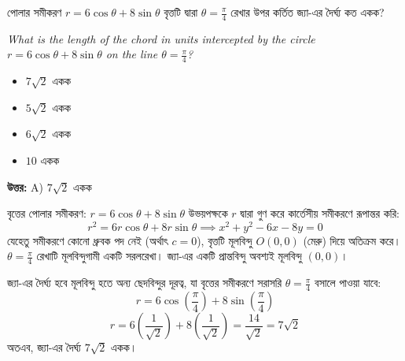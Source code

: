 \documentclass[12pt, a4paper]{article}
\begin{document}
\begin{tcolorbox}[questionbox={প্রশ্ন (Question) 4}]
    \noindent
    পোলার সমীকরণ $r = 6\cos\theta + 8\sin\theta$ বৃত্তটি দ্বারা $\theta = \frac{\pi}{4}$ রেখার উপর কর্তিত জ্যা-এর দৈর্ঘ্য কত একক?
    
    \vspace{0.8em}
    \begin{english}
    \noindent\textit{\color{darkgray}
    What is the length of the chord in units intercepted by the circle $r = 6\cos\theta + 8\sin\theta$ on the line $\theta = \frac{\pi}{4}$?
    }
    \end{english}
\end{tcolorbox}

\begin{itemize}[label={}, leftmargin=1cm, itemsep=0.5em]
    \item[\textbf{A)}] $7\sqrt{2}$ একক
    \item[\textbf{B)}] $5\sqrt{2}$ একক
    \item[\textbf{C)}] $6\sqrt{2}$ একক
    \item[\textbf{D)}] $10$ একক
\end{itemize}

\vspace{0.5em}
\begin{tcolorbox}[answerbox]
    \textbf{\color{success} উত্তর:} A) $7\sqrt{2}$ একক
\end{tcolorbox}
\vspace{1em}

\begin{tcolorbox}[solutionbox={সমাধান (Solution)}]
    \noindent
    বৃত্তের পোলার সমীকরণ: $r = 6\cos\theta + 8\sin\theta$
    উভয়পক্ষকে $r$ দ্বারা গুণ করে কার্তেসীয় সমীকরণে রূপান্তর করি:
    \[ r^2 = 6r\cos\theta + 8r\sin\theta \implies x^2 + y^2 - 6x - 8y = 0 \]
    যেহেতু সমীকরণে কোনো ধ্রুবক পদ নেই (অর্থাৎ $c=0$), বৃত্তটি মূলবিন্দু $O(0, 0)$ (মেরু) দিয়ে অতিক্রম করে। $\theta = \frac{\pi}{4}$ রেখাটি মূলবিন্দুগামী একটি সরলরেখা। জ্যা-এর একটি প্রান্তবিন্দু অবশ্যই মূলবিন্দু $(0, 0)$। 
    
    \vspace{0.5em}
    জ্যা-এর দৈর্ঘ্য হবে মূলবিন্দু হতে অন্য ছেদবিন্দুর দূরত্ব, যা বৃত্তের সমীকরণে সরাসরি $\theta = \frac{\pi}{4}$ বসালে পাওয়া যাবে:
    \[ r = 6\cos\left(\frac{\pi}{4}\right) + 8\sin\left(\frac{\pi}{4}\right) \]
    \[ r = 6\left(\frac{1}{\sqrt{2}}\right) + 8\left(\frac{1}{\sqrt{2}}\right) = \frac{14}{\sqrt{2}} = 7\sqrt{2} \]
    অতএব, জ্যা-এর দৈর্ঘ্য $7\sqrt{2}$ একক।
\end{tcolorbox}
\end{document}
